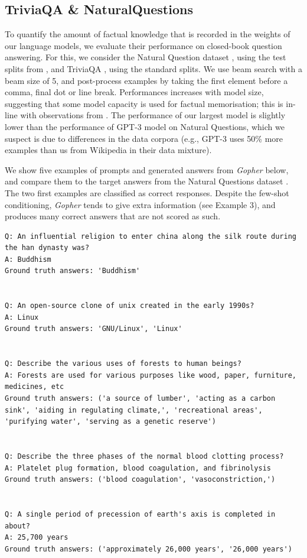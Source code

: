 \documentclass[11pt, a4paper, logo, internal, copyright, nonumbering]{deepmind}
\newcommand{\gopher}{\textit{Gopher}\xspace}
\begin{document}
\subsection{TriviaQA \& NaturalQuestions}
\label{sec:qa}
To quantify the amount of factual knowledge that is recorded in the weights of our language models, we evaluate their performance on closed-book question answering.
For this, we consider the Natural Question dataset \citep{naturalquestions}, using the test splits from \citet{lee_latent_2019}, and TriviaQA \citep{triviaqa}, using the standard splits.
We use beam search with a beam size of 5, and post-process examples by taking the first element before a comma, final dot or line break. Performances increases with model size, suggesting that some model capacity is used for factual memorisation; this is in-line with observations from \citep{gpt3}.
The performance of our largest model is slightly lower than the performance of GPT-3 model on Natural Questions, which we suspect is due to differences in the data corpora (e.g., GPT-3 uses 50\% more examples than us from Wikipedia in their data mixture).

We show five examples of prompts and generated answers from \gopher below, and compare them to the target answers from the Natural Questions dataset \citep{naturalquestions}. The two first examples are classified as correct responses.
Despite the few-shot conditioning, \gopher tends to give extra information (see Example 3), and produces many correct answers that are not scored as such.
{
\footnotesize
\begin{verbatim}
Q: An influential religion to enter china along the silk route during the han dynasty was?
A: Buddhism
Ground truth answers: 'Buddhism'


Q: An open-source clone of unix created in the early 1990s?
A: Linux
Ground truth answers: 'GNU/Linux', 'Linux'


Q: Describe the various uses of forests to human beings?
A: Forests are used for various purposes like wood, paper, furniture, medicines, etc
Ground truth answers: ('a source of lumber', 'acting as a carbon sink', 'aiding in regulating climate,', 'recreational areas', 'purifying water', 'serving as a genetic reserve')


Q: Describe the three phases of the normal blood clotting process?
A: Platelet plug formation, blood coagulation, and fibrinolysis
Ground truth answers: ('blood coagulation', 'vasoconstriction,')


Q: A single period of precession of earth's axis is completed in about?
A: 25,700 years
Ground truth answers: ('approximately 26,000 years', '26,000 years')
\end{verbatim}
}
\end{document}
